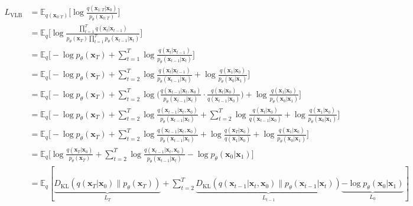 \documentclass[12pt]{article}
\begin{document}
\[
\begin{aligned}
L_\text{VLB} 
&= \mathbb{E}_{q(\mathbf{x}_{0:T})} \Big[ \log\frac{q(\mathbf{x}_{1:T}\vert\mathbf{x}_0)}{p_\theta(\mathbf{x}_{0:T})} \Big] \\
&= \mathbb{E}_q \Big[ \log\frac{\prod_{t=1}^T q(\mathbf{x}_t\vert\mathbf{x}_{t-1})}{ p_\theta(\mathbf{x}_T) \prod_{t=1}^T p_\theta(\mathbf{x}_{t-1} \vert\mathbf{x}_t) } \Big] \\
&= \mathbb{E}_q \Big[ -\log p_\theta(\mathbf{x}_T) + \sum_{t=1}^T \log \frac{q(\mathbf{x}_t\vert\mathbf{x}_{t-1})}{p_\theta(\mathbf{x}_{t-1} \vert\mathbf{x}_t)} \Big] \\
&= \mathbb{E}_q \Big[ -\log p_\theta(\mathbf{x}_T) + \sum_{t=2}^T \log \frac{q(\mathbf{x}_t\vert\mathbf{x}_{t-1})}{p_\theta(\mathbf{x}_{t-1} \vert\mathbf{x}_t)} + \log\frac{q(\mathbf{x}_1 \vert \mathbf{x}_0)}{p_\theta(\mathbf{x}_0 \vert \mathbf{x}_1)} \Big] \\
&= \mathbb{E}_q \Big[ -\log p_\theta(\mathbf{x}_T) + \sum_{t=2}^T \log \Big( \frac{q(\mathbf{x}_{t-1} \vert \mathbf{x}_t, \mathbf{x}_0)}{p_\theta(\mathbf{x}_{t-1} \vert\mathbf{x}_t)}\cdot \frac{q(\mathbf{x}_t \vert \mathbf{x}_0)}{q(\mathbf{x}_{t-1}\vert\mathbf{x}_0)} \Big) + \log \frac{q(\mathbf{x}_1 \vert \mathbf{x}_0)}{p_\theta(\mathbf{x}_0 \vert \mathbf{x}_1)} \Big] \\
&= \mathbb{E}_q \Big[ -\log p_\theta(\mathbf{x}_T) + \sum_{t=2}^T \log \frac{q(\mathbf{x}_{t-1} \vert \mathbf{x}_t, \mathbf{x}_0)}{p_\theta(\mathbf{x}_{t-1} \vert\mathbf{x}_t)} + \sum_{t=2}^T \log \frac{q(\mathbf{x}_t \vert \mathbf{x}_0)}{q(\mathbf{x}_{t-1} \vert \mathbf{x}_0)} + \log\frac{q(\mathbf{x}_1 \vert \mathbf{x}_0)}{p_\theta(\mathbf{x}_0 \vert \mathbf{x}_1)} \Big] \\
&= \mathbb{E}_q \Big[ -\log p_\theta(\mathbf{x}_T) + \sum_{t=2}^T \log \frac{q(\mathbf{x}_{t-1} \vert \mathbf{x}_t, \mathbf{x}_0)}{p_\theta(\mathbf{x}_{t-1} \vert\mathbf{x}_t)} + \log\frac{q(\mathbf{x}_T \vert \mathbf{x}_0)}{q(\mathbf{x}_1 \vert \mathbf{x}_0)} + \log \frac{q(\mathbf{x}_1 \vert \mathbf{x}_0)}{p_\theta(\mathbf{x}_0 \vert \mathbf{x}_1)} \Big]\\
&= \mathbb{E}_q \Big[ \log\frac{q(\mathbf{x}_T \vert \mathbf{x}_0)}{p_\theta(\mathbf{x}_T)} + \sum_{t=2}^T \log \frac{q(\mathbf{x}_{t-1} \vert \mathbf{x}_t, \mathbf{x}_0)}{p_\theta(\mathbf{x}_{t-1} \vert\mathbf{x}_t)} - \log p_\theta(\mathbf{x}_0 \vert \mathbf{x}_1) \Big] \\
&= \mathbb{E}_q \left[\underbrace{D_\text{KL}(q(\mathbf{x}_T \vert \mathbf{x}_0) \parallel p_\theta(\mathbf{x}_T))}_{L_T} + \sum_{t=2}^T \underbrace{D_\text{KL}(q(\mathbf{x}_{t-1} \vert \mathbf{x}_t, \mathbf{x}_0) \parallel p_\theta(\mathbf{x}_{t-1} \vert\mathbf{x}_t))}_{L_{t-1}} \underbrace{- \log p_\theta(\mathbf{x}_0 \vert \mathbf{x}_1)}_{L_0} \right]
\end{aligned}
\]
\end{document}
